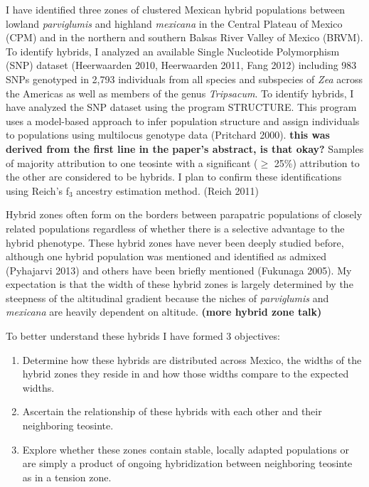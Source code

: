 \documentclass[12pt]{amsart}
\newcommand{\mbh}[1]{\textcolor{red}{ \emph{\scriptsize  #1}} }
\begin{document}
I have identified three zones of clustered Mexican hybrid populations between lowland \textit{parviglumis} and highland \textit{mexicana} in the Central Plateau of Mexico (CPM) and in the northern and southern Balsas River Valley of Mexico (BRVM). 
To identify hybrids, I analyzed an available Single Nucleotide Polymorphism (SNP) dataset  (Heerwaarden 2010, Heerwaarden 2011, Fang 2012) including 983 SNPs genotyped in 2,793 individuals from all species and subspecies of \textit{Zea} across the Americas as well as members of the genus \textit{Tripsacum}.  
To identify hybrids, I have analyzed the SNP dataset using the program STRUCTURE.
This program uses a model-based approach to infer population structure and assign individuals to populations using multilocus genotype data (Pritchard 2000). \textbf{this was derived from the first line in the paper's abstract, is that okay?}
Samples of majority attribution to one teosinte with a significant ($\geq$ 25\%) attribution to the other are considered to be hybrids.
I plan to confirm these identifications using Reich's f$_{\text{3}}$ ancestry estimation method. (Reich  2011)%


Hybrid zones often form on the borders between parapatric populations of closely related populations regardless of whether there is a selective advantage to the hybrid phenotype.
These hybrid zones have never been deeply studied before, although one hybrid population was mentioned and identified as admixed (Pyhajarvi 2013)  and others have been briefly mentioned (Fukunaga 2005).
My expectation is that the width of these hybrid zones is largely determined by the steepness of the altitudinal gradient because the niches of \textit{parviglumis} and \textit{mexicana} are heavily dependent on altitude.
 \textbf{(more hybrid zone talk)} 


To better understand these hybrids I have formed 3 objectives: 
\begin{enumerate} 
	\item Determine how these hybrids are distributed across Mexico, the widths of the hybrid zones they reside in and how those widths compare to the expected widths.
	\item Ascertain the relationship of these hybrids with each other and their neighboring teosinte.
	\item Explore whether these zones contain stable, locally adapted populations or are simply a product of ongoing hybridization between neighboring teosinte as in a tension zone.
\end{enumerate} 
\end{document}
